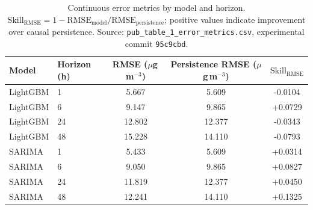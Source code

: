 \documentclass[12pt]{article}
\begin{document}
\pagestyle{empty}
\begin{table}[ht]
\centering
\caption{Continuous error metrics by model and horizon.
$\mathrm{Skill}_\mathrm{RMSE} = 1 - \mathrm{RMSE}_\mathrm{model} /
\mathrm{RMSE}_\mathrm{persistence}$; positive values indicate
improvement over causal persistence.
Source: \texttt{pub\_table\_1\_error\_metrics.csv}, experimental commit
\texttt{95c9cbd}.}
\label{tab:error_metrics}
\begin{tabular}{llSSS}
\toprule
Model & Horizon (h) &
  {RMSE ($\mu$g\,m$^{-3}$)} &
  {Persistence RMSE ($\mu$g\,m$^{-3}$)} &
  {$\mathrm{Skill}_\mathrm{RMSE}$} \\
\midrule
LightGBM & 1  & 5.667 & 5.609 & -0.0104 \\
LightGBM & 6  & 9.147 & 9.865 & +0.0729 \\
LightGBM & 24 & 12.802 & 12.377 & -0.0343 \\
LightGBM & 48 & 15.228 & 14.110 & -0.0793 \\
\addlinespace
SARIMA   & 1  & 5.433 & 5.609 & +0.0314 \\
SARIMA   & 6  & 9.050 & 9.865 & +0.0827 \\
SARIMA   & 24 & 11.819 & 12.377 & +0.0450 \\
SARIMA   & 48 & 12.241 & 14.110 & +0.1325 \\
\bottomrule
\end{tabular}
\end{table}
\end{document}
